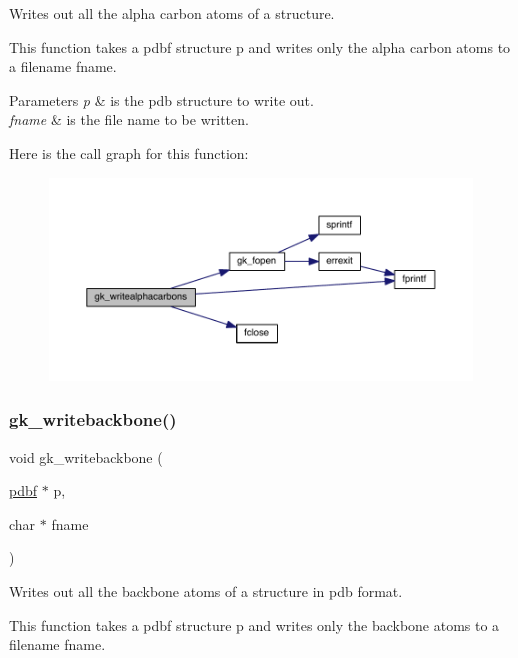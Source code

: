 Writes out all the alpha carbon atoms of a structure. 

This function takes a pdbf structure p and writes only the alpha carbon atoms to a filename fname.


\begin{DoxyParams}{Parameters}
{\em p} & is the pdb structure to write out. \\
\hline
{\em fname} & is the file name to be written. \\
\hline
\end{DoxyParams}
Here is the call graph for this function\+:\nopagebreak
\begin{figure}[H]
\begin{center}
\leavevmode
\includegraphics[width=350pt]{a00125_ad0eef52d1d7e2da669accced22e821a4_cgraph}
\end{center}
\end{figure}
\mbox{\label{a00125_a04817c574e29493f0363ef81b41f82df}} 
\subsubsection{\texorpdfstring{gk\+\_\+writebackbone()}{gk\_writebackbone()}}
{\footnotesize\ttfamily void gk\+\_\+writebackbone (\begin{DoxyParamCaption}\item[{\hyperlink{a00666}{pdbf} $\ast$}]{p,  }\item[{char $\ast$}]{fname }\end{DoxyParamCaption})}



Writes out all the backbone atoms of a structure in pdb format. 

This function takes a pdbf structure p and writes only the backbone atoms to a filename fname.


